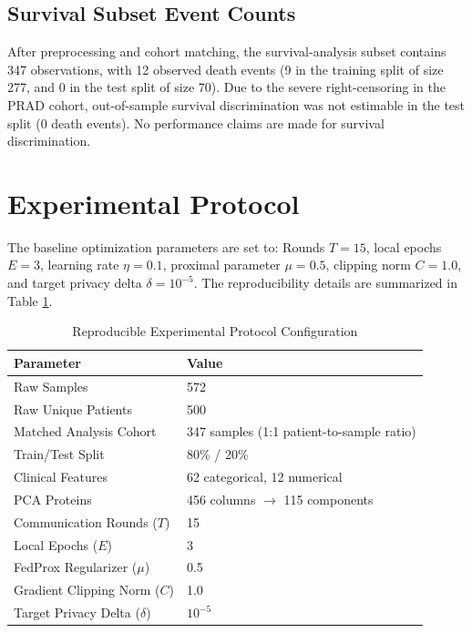 \documentclass[conference]{IEEEtran}
\begin{document}
\subsection{Survival Subset Event Counts}
After preprocessing and cohort matching, the survival-analysis subset contains 347 observations, with 12 observed death events (9 in the training split of size 277, and 0 in the test split of size 70).
Due to the severe right-censoring in the PRAD cohort, out-of-sample survival discrimination was not estimable in the test split (0 death events). No performance claims are made for survival discrimination.

\section{Experimental Protocol}
The baseline optimization parameters are set to: Rounds $T=15$, local epochs $E=3$, learning rate $\eta=0.1$, proximal parameter $\mu=0.5$, clipping norm $C=1.0$, and target privacy delta $\delta=10^{-5}$. The reproducibility details are summarized in Table \ref{tab:protocol}.

\begin{table}[ht]
\caption{Reproducible Experimental Protocol Configuration}
\centering
\begin{tabular}{ll}
\toprule
Parameter & Value \\
\midrule
Raw Samples & 572 \\
Raw Unique Patients & 500 \\
Matched Analysis Cohort & 347 samples (1:1 patient-to-sample ratio) \\
Train/Test Split & 80\% / 20\% \\
Clinical Features & 62 categorical, 12 numerical \\
PCA Proteins & 456 columns $\to$ 115 components \\
Communication Rounds ($T$) & 15 \\
Local Epochs ($E$) & 3 \\
FedProx Regularizer ($\mu$) & 0.5 \\
Gradient Clipping Norm ($C$) & 1.0 \\
Target Privacy Delta ($\delta$) & $10^{-5}$ \\
\bottomrule
\end{tabular}
\label{tab:protocol}
\end{table}
\end{document}
